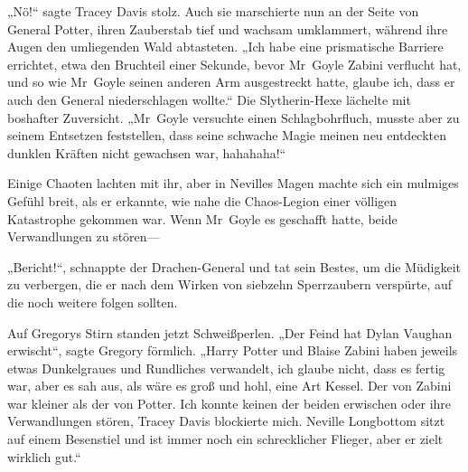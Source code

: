 „Nö!“ sagte Tracey Davis stolz. Auch sie marschierte nun an der Seite von General Potter, ihren Zauberstab tief und wachsam umklammert, während ihre Augen den umliegenden Wald abtasteten. „Ich habe eine prismatische Barriere errichtet, etwa den Bruchteil einer Sekunde, bevor Mr~Goyle Zabini verflucht hat, und so wie Mr~Goyle seinen anderen Arm ausgestreckt hatte, glaube ich, dass er auch den General niederschlagen wollte.“ Die Slytherin-Hexe lächelte mit boshafter Zuversicht. „Mr~Goyle versuchte einen Schlagbohrfluch, musste aber zu seinem Entsetzen feststellen, dass seine schwache Magie meinen neu entdeckten dunklen Kräften nicht gewachsen war, hahahaha!“

Einige Chaoten lachten mit ihr, aber in Nevilles Magen machte sich ein mulmiges Gefühl breit, als er erkannte, wie nahe die Chaos-Legion einer völligen Katastrophe gekommen war. Wenn Mr~Goyle es geschafft hatte, beide Verwandlungen zu stören—

\later

„Bericht!“, schnappte der Drachen-General und tat sein Bestes, um die Müdigkeit zu verbergen, die er nach dem Wirken von siebzehn Sperrzaubern verspürte, auf die noch weitere folgen sollten.

Auf Gregorys Stirn standen jetzt Schweißperlen. „Der Feind hat Dylan Vaughan erwischt“, sagte Gregory förmlich. „Harry Potter und Blaise Zabini haben jeweils etwas Dunkelgraues und Rundliches verwandelt, ich glaube nicht, dass es fertig war, aber es sah aus, als wäre es groß und hohl, eine Art Kessel. Der von Zabini war kleiner als der von Potter. Ich konnte keinen der beiden erwischen oder ihre Verwandlungen stören, Tracey Davis blockierte mich. Neville Longbottom sitzt auf einem Besenstiel und ist immer noch ein schrecklicher Flieger, aber er zielt wirklich gut.“


